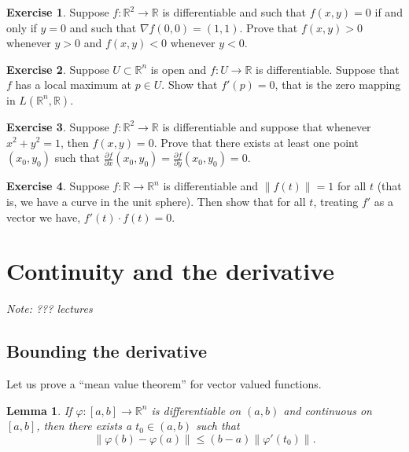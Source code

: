 \documentclass[12pt]{book}
\newcommand{\snorm}[1]{\lVert {#1} \rVert}
\newcommand{\R}{{\mathbb{R}}}
\newcommand{\sectionnotes}[1]{\noindent \emph{Note: #1} \medskip \par}
\newcommand{\sectionnewpage}{\clearpage}
\theoremstyle{plain}
\newtheorem{lemma}[thm]{Lemma}
\theoremstyle{remark}
\theoremstyle{definition}
\theoremstyle{exercise}
\newtheorem{exercise}{Exercise}[section]
\theoremstyle{example}
\begin{document}
\begin{exercise}
Suppose $f \colon \R^2 \to \R$ is differentiable and such that
$f(x,y) = 0$ if and only if $y=0$ and such that $\nabla f(0,0) = (1,1)$.
Prove that $f(x,y) > 0$ whenever $y > 0$ and
$f(x,y) < 0$ whenever $y < 0$.
\end{exercise}

\begin{exercise}
Suppose $U \subset \R^n$ is open and
$f \colon U \to \R$ is differentiable.  Suppose that $f$ has a local maximum
at $p \in U$.  Show that $f'(p) = 0$, that is the zero mapping in
$L(\R^n,\R)$.
\end{exercise}

\begin{exercise}
Suppose $f \colon \R^2 \to \R$ is differentiable and suppose that
whenever $x^2+y^2 = 1$, then $f(x,y) = 0$.  Prove that there exists at least
one point $(x_0,y_0)$ such that
$\frac{\partial f}{\partial x}(x_0,y_0) = \frac{\partial f}{\partial
y}(x_0,y_0) = 0$.
\end{exercise}

\begin{exercise}
Suppose $f \colon \R \to \R^n$ is differentiable and $\snorm{f(t)} = 1$ for
all $t$ (that is, we have a curve in the unit sphere).  Then show that for
all $t$, treating $f'$ as a vector we have, $f'(t) \cdot f(t) = 0$.
\end{exercise}




\sectionnewpage
\section{Continuity and the derivative}
\label{sec:svthedercont}

\sectionnotes{??? lectures}

\subsection{Bounding the derivative}

Let us prove a ``mean value theorem'' for vector valued functions.

\begin{lemma}
If $\varphi \colon [a,b] \to \R^n$ is differentiable on $(a,b)$ and
continuous on $[a,b]$, then there exists a $t_0 \in (a,b)$ such that
\begin{equation*}
\snorm{\varphi(b)-\varphi(a)} \leq (b-a) \snorm{\varphi'(t_0)} .
\end{equation*}
\end{lemma}
\end{document}
